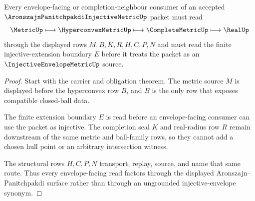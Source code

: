 \begin{theorem}
\label{thm:aronszajn-panitchpakdi-injective-metric-envelope-route}
Every envelope-facing or completion-neighbour consumer of an accepted $\AronszajnPanitchpakdiInjectiveMetricUp$ packet must read
$$
\MetricUp\longmapsto \HyperconvexMetricUp\longmapsto \CompleteMetricUp\longmapsto \RealUp
$$
through the displayed rows $M,B,K,R,H,C,P,N$ and must read the finite injective-extension boundary $E$ before it treats the packet as an $\InjectiveEnvelopeMetricUp$ source.
\end{theorem}
\begin{proof}
Start with the carrier and obligation theorem. The metric source $M$ is displayed before the hyperconvex row $B$, and $B$ is the only row that exposes compatible closed-ball data.

The finite extension boundary $E$ is read before an envelope-facing consumer can use the packet as injective. The completion seal $K$ and real-radius row $R$ remain downstream of the same metric and ball-family rows, so they cannot add a chosen hull point or an arbitrary intersection witness.

The structural rows $H,C,P,N$ transport, replay, source, and name that same route. Thus every envelope-facing read factors through the displayed Aronszajn--Panitchpakdi surface rather than through an ungrounded injective-envelope synonym.
\end{proof}




